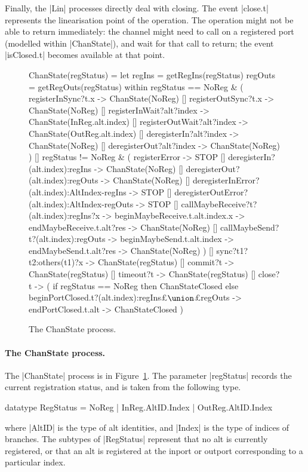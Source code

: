 Finally, the |Lin| processes directly deal with closing.  The event |close.t|
represents the linearisation point of the operation.  The 
operation might not be able to return immediately: the channel might need to
call  on a registered port (modelled within |ChanState|),
and wait for that call to return; the event |isClosed.t| becomes available at
that point.

 
\begin{figure}
\begin{cspm}
ChanState(regStatus) = 
  let regIns = getRegIns(regStatus)
      regOuts = getRegOuts(regStatus)
  within
  regStatus == NoReg & (
    registerInSync?t.x -> ChanState(NoReg) 
    [] registerOutSync?t.x -> ChanState(NoReg)
    [] registerInWait?alt?index -> ChanState(InReg.alt.index)
    [] registerOutWait?alt?index -> ChanState(OutReg.alt.index)
    [] deregisterIn?alt?index ->  ChanState(NoReg)
    [] deregisterOut?alt?index ->  ChanState(NoReg)
  )
  []
  regStatus != NoReg & (
    registerError -> STOP
    [] deregisterIn?(alt.index):regIns ->  ChanState(NoReg)
    [] deregisterOut?(alt.index):regOuts -> ChanState(NoReg)
    [] deregisterInError?(alt.index):AltIndex-regIns -> STOP
    [] deregisterOutError?(alt.index):AltIndex-regOuts -> STOP
    [] callMaybeReceive?t?(alt.index):regIns?x -> beginMaybeReceive.t.alt.index.x -> 
         endMaybeReceive.t.alt?res -> ChanState(NoReg)
    [] callMaybeSend?t?(alt.index):regOuts -> beginMaybeSend.t.alt.index -> 
         endMaybeSend.t.alt?res -> ChanState(NoReg)
  )
  [] 
  sync?t1?t2:others(t1)?x -> ChanState(regStatus)
  []
  commit?t -> ChanState(regStatus)
  []
  timeout?t -> ChanState(regStatus)
  []
  close?t -> (
    if regStatus == NoReg then ChanStateClosed
    else    
      beginPortClosed.t?(alt.index):regIns£$\union$£regOuts ->
      endPortClosed.t.alt -> ChanStateClosed
  )
\end{cspm}
\caption{The {\scalashape ChanState} process.  \label{fig:ChanState}}
\end{figure}


\paragraph{The {\cspmstyle ChanState} process.}

The |ChanState| process is in Figure~\ref{fig:ChanState}.  The parameter
|regStatus| records the current registration status, and is taken from the
following type.
%
\begin{cspm}
datatype RegStatus = NoReg | InReg.AltID.Index | OutReg.AltID.Index
\end{cspm}
%
where |AltID| is the type of alt identities, and |Index| is the type of
indices of branches.  The subtypes of |RegStatus| represent that no alt is
currently registered, or that an alt is registered at the inport or outport
corresponding to a particular index.  

